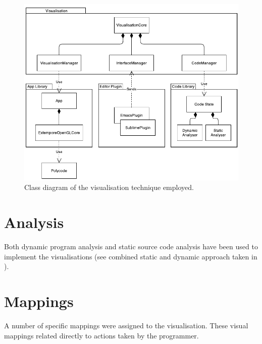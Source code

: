 \begin{figure}
  \centering \includegraphics[width=\columnwidth]{../images/diagrams/visualisation-class-diagram}
  \caption{Class diagram of the visualisation technique employed.}
\label{fig:visualisation-class-diagram}
\end{figure}

\section{Analysis}

Both dynamic program analysis and static source code analysis have been used to implement the visualisations (see combined static and dynamic approach taken in \cite{Eisenbarth2003}).

\section{Mappings}

A number of specific mappings were assigned to the visualisation. These visual mappings related directly to actions taken by the programmer. 



